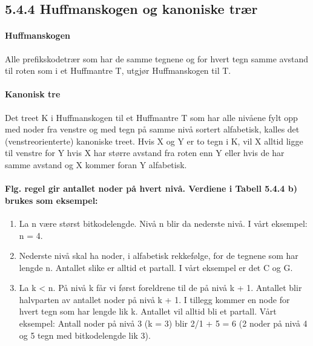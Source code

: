 \documentclass[11pt]{article}
\begin{document}
\newpage

    \subsection{5.4.4 Huffmanskogen og kanoniske trær}

        \paragraph{Huffmanskogen} Alle prefikskodetrær som har de samme tegnene og for hvert
        tegn samme avstand til roten som i et Huffmantre T, utgjør Huffmanskogen til T.

        \paragraph{Kanonisk tre} Det treet K i Huffmanskogen til et Huffmantre T som har alle
        nivåene fylt opp med noder fra venstre og med tegn på samme nivå sortert
        alfabetisk, kalles det (venstreorienterte) kanoniske treet. Hvis X og Y er to tegn i
        K, vil X alltid ligge til venstre for Y hvis X har større avstand fra roten enn Y eller
        hvis de har samme avstand og X kommer foran Y alfabetisk.

        \paragraph{Flg. regel gir antallet noder på hvert nivå. Verdiene i Tabell 5.4.4 b) brukes som eksempel: }
        \begin{enumerate}
            \item La n være størst bitkodelengde. Nivå n blir da nederste nivå. I vårt eksempel: n = 4.
            \item Nederste nivå skal ha noder, i alfabetisk rekkefølge, for de tegnene som har lengde n.
            Antallet slike er alltid et partall. I vårt eksempel er det C og G.
            \item La k < n. På nivå k får vi først foreldrene til de på nivå k + 1. Antallet blir halvparten av
            antallet noder på nivå k + 1. I tillegg kommer en node for hvert tegn som har lengde lik
            k. Antallet vil alltid bli et partall. Vårt eksempel: Antall noder på nivå 3 (k = 3) blir 2/1
            + 5 = 6 (2 noder på nivå 4 og 5 tegn med bitkodelengde lik 3). 
        \end{enumerate}
\end{document}
